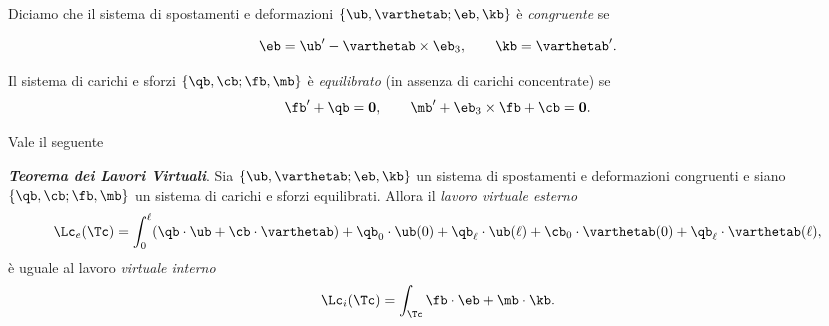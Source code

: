 Diciamo che il sistema di spostamenti e deformazioni $\{\ub, \varthetab; \eb, \kb\}$ è \textit{congruente} se

\begin{equation}\label{siscongr}
		\eb=\ub'-\varthetab\times \eb_3,  \qquad \kb=\varthetab'.
\end{equation}

Il sistema di  carichi e sforzi $\{\qb, \cb; \fb, \mb\}$ è \textit{equilibrato} (in assenza di carichi concentrate) se
\begin{equation}
\fb'+\qb =\mathbf{0}, \qquad \mb'+\eb_{3}\times \fb +\cb=\mathbf{0}.
\end{equation}

%


Vale il seguente 
\begin{definition}
	\textbf{\textit{Teorema dei Lavori Virtuali}}. Sia $\{\ub, \varthetab; \eb, \kb\}$ un sistema di spostamenti e deformazioni congruenti e siano  $\{\qb, \cb; \fb, \mb\}$ un sistema di carichi e sforzi equilibrati. Allora il \textit{lavoro virtuale esterno}
	\begin{equation}
		\begin{aligned}
			\Lc_e(\Tc)=\int_0^\ell(\qb\cdot \ub+\cb\cdot \varthetab)+\qb_0\cdot \ub(0)+\qb_\ell\cdot \ub(\ell)+\cb_0\cdot \varthetab(0)+\qb_\ell\cdot \varthetab(\ell),
		\end{aligned}
	\end{equation}
	è uguale al lavoro \textit{virtuale interno }
	\begin{equation}
		\Lc_i(\Tc)=\int_{\Tc}\fb \cdot \eb + \mb \cdot \kb.
	\end{equation}
\end{definition}

